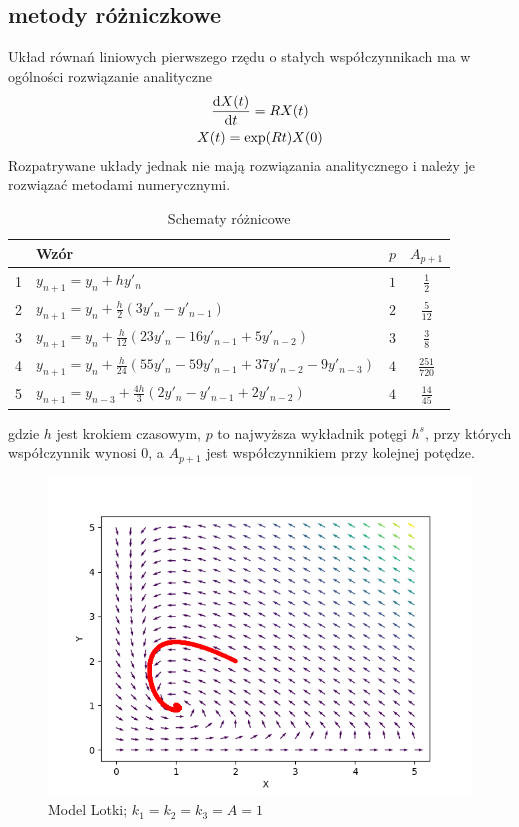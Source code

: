 \documentclass[10pt, a4paper, twoside, onecolumn]{article}
\numberwithin{equation}{section}
\begin{document}
	\subsection{metody różniczkowe}
	Układ równań liniowych pierwszego rzędu o stałych współczynnikach ma w ogólności rozwiązanie analityczne \cite{palczewski}
	\begin{gather}
		\dv{X(t)}{t}=RX(t) \\
		X(t)=\exp(Rt)X(0)
	\end{gather}
	Rozpatrywane układy jednak nie mają rozwiązania analitycznego i należy je rozwiązać metodami numerycznymi. \par
	\begin{table}[H]\label{tab:schematy}
		\centering
		\begin{tabular}{|l|l|c|c|}
			\hline
			 & Wzór & \(p\) & \(A_{p+1}\) \\
			\hline
			1 & \(y_{n+1}=y_{n}+hy'_{n}\) & \(1\) & \(\frac{1}{2}\) \\
			\hline
			2 & \(y_{n+1}=y_{n}+\frac{h}{2}(3y'_{n}-y'_{n-1})\) & \(2\) & \(\frac{5}{12}\) \\
			\hline
			3 & \(y_{n+1}=y_{n}+\frac{h}{12}(23y'_{n}-16y'_{n-1}+5y'_{n-2})\) & \(3\) & \(\frac{3}{8}\) \\
			\hline
			4 & \(y_{n+1}=y_{n}+\frac{h}{24}(55y'_{n}-59y'_{n-1}+37y'_{n-2}-9y'_{n-3})\) & \(4\) & \(\frac{251}{720}\) \\
			\hline
			5 & \(y_{n+1}=y_{n-3}+\frac{4h}{3}(2y'_{n}-y'_{n-1}+2y'_{n-2})\) & \(4\) & \(\frac{14}{45}\) \\
			\hline
		\end{tabular}
		\caption{Schematy różnicowe}
	\end{table}
	gdzie \(h\) jest krokiem czasowym, \(p\) to najwyższa wykładnik potęgi \(h^{s}\), przy których współczynnik wynosi \(0\), a \(A_{p+1}\) jest współczynnikiem przy kolejnej potędze.
	\begin{figure}[H]\label{img:lotka}
		\centering
		\includegraphics{lotka.png}
		\caption{Model Lotki; \(k_{1}=k_{2}=k_{3}=A=1\)}
	\end{figure}
\end{document}
